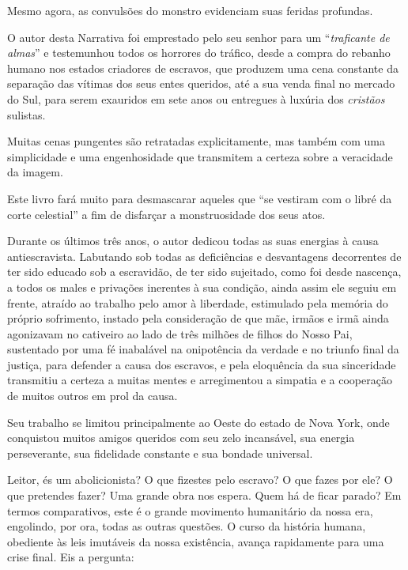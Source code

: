 Mesmo agora, as convulsões do monstro evidenciam suas feridas profundas.

O autor desta Narrativa foi emprestado pelo seu senhor para um
``\emph{traficante de almas}'' e testemunhou todos os horrores do
tráfico, desde a compra do rebanho humano nos estados criadores de
escravos, que produzem uma cena constante da separação das vítimas dos
seus entes queridos, até a sua venda final no mercado do Sul, para serem
exauridos em sete anos ou entregues à luxúria dos \emph{cristãos}
sulistas.

Muitas cenas pungentes são retratadas explicitamente, mas também com uma
simplicidade e uma engenhosidade que transmitem a certeza sobre a
veracidade da imagem.

Este livro fará muito para desmascarar aqueles que ``se vestiram com o
libré da corte celestial'' a fim de disfarçar a monstruosidade dos seus
atos.

Durante os últimos três anos, o autor dedicou todas as suas energias à
causa antiescravista. Labutando sob todas as deficiências e desvantagens
decorrentes de ter sido educado sob a escravidão, de ter sido sujeitado,
como foi desde nascença, a todos os males e privações inerentes à sua
condição, ainda assim ele seguiu em frente, atraído ao trabalho pelo
amor à liberdade, estimulado pela memória do próprio sofrimento, instado
pela consideração de que mãe, irmãos e irmã ainda agonizavam no
cativeiro ao lado de três milhões de filhos do Nosso Pai, sustentado por
uma fé inabalável na onipotência da verdade e no triunfo final da
justiça, para defender a causa dos escravos, e pela eloquência da sua
sinceridade transmitiu a certeza a muitas mentes e arregimentou a
simpatia e a cooperação de muitos outros em prol da causa.

Seu trabalho se limitou principalmente ao Oeste do estado de Nova York,
onde conquistou muitos amigos queridos com seu zelo incansável, sua
energia perseverante, sua fidelidade constante e sua bondade universal.

Leitor, és um abolicionista? O que fizestes pelo escravo? O que fazes
por ele? O que pretendes fazer? Uma grande obra nos espera. Quem há de
ficar parado? Em termos comparativos, este é o grande movimento
humanitário da nossa era, engolindo, por ora, todas as outras questões.
O curso da história humana, obediente às leis imutáveis da nossa
existência, avança rapidamente para uma crise final. Eis a pergunta:

